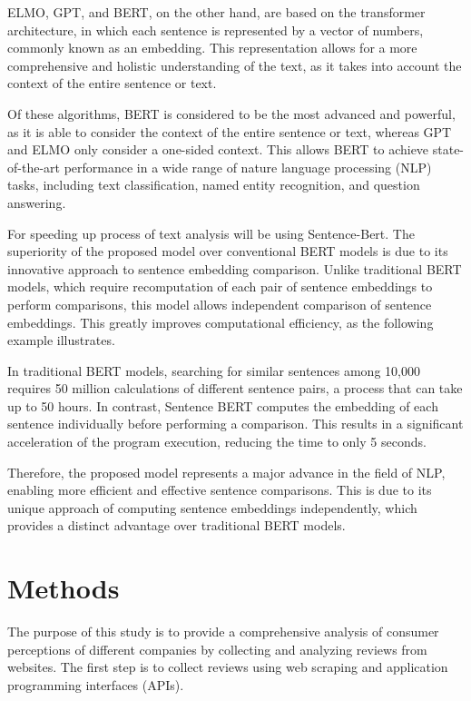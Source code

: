 \documentclass[PI]{ProjectProposal}
\begin{document}
ELMO, GPT, and BERT, on the other hand, are based on the transformer architecture, in which each sentence is represented by a vector of numbers, commonly known as an embedding. This representation allows for a more comprehensive and holistic understanding of the text, as it takes into account the context of the entire sentence or text.

Of these algorithms, BERT is considered to be the most advanced and powerful\autocite{devlin2018bert}, as it is able to consider the context of the entire sentence or text, whereas GPT and ELMO only consider a one-sided context. This allows BERT to achieve state-of-the-art performance in a wide range of nature language processing (NLP) tasks, including text classification, named entity recognition, and question answering.

For speeding up process of text analysis will be using Sentence-Bert\autocite{reimers-2019-sentence-bert}. The superiority of the proposed model over conventional BERT models is due to its innovative approach to sentence embedding comparison. Unlike traditional BERT models, which require recomputation of each pair of sentence embeddings to perform comparisons, this model allows independent comparison of sentence embeddings. This greatly improves computational efficiency, as the following example illustrates.

In traditional BERT models, searching for similar sentences among 10,000 requires 50 million calculations of different sentence pairs, a process that can take up to 50 hours. In contrast, Sentence BERT computes the embedding of each sentence individually before performing a comparison. This results in a significant acceleration of the program execution, reducing the time to only 5 seconds.

Therefore, the proposed model represents a major advance in the field of NLP, enabling more efficient and effective sentence comparisons. This is due to its unique approach of computing sentence embeddings independently, which provides a distinct advantage over traditional BERT models.
\section{Methods}
\label{sec:orgcc088cb}
The purpose of this study is to provide a comprehensive analysis of consumer perceptions of different companies by collecting and analyzing reviews from websites. The first step is to collect reviews using web scraping and application programming interfaces (APIs).
\end{document}
